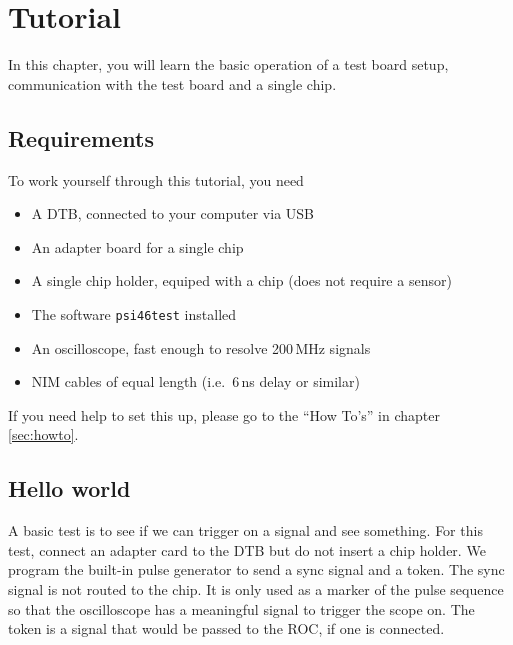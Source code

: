 \chapter{Tutorial}
In this chapter, you will learn the basic operation of a test board setup, communication with the test board and a single chip.

\section{Requirements}
To work yourself through this tutorial, you need
\begin{itemize}
    \item A DTB, connected to your computer via USB
    \item An adapter board for a single chip
    \item A single chip holder, equiped with a chip (does not require a sensor)
    \item The software \texttt{psi46test} installed
    \item An oscilloscope, fast enough to resolve 200\,MHz signals
    \item NIM cables of equal length (i.e.\, 6\,ns delay or similar)
\end{itemize}


If you need help to set this up, please go to the \enquote{How To's} in chapter \ref{sec:howto}.


\section{Hello world}



A basic test is to see if we can trigger on a signal and see something. For this test, connect an adapter card to the DTB but do not insert a chip holder. We program the built-in pulse generator to send a sync signal and a token. The sync signal is not routed to the chip. It is only used as a marker of the pulse sequence so that the oscilloscope has a meaningful signal to trigger the scope on. The token is a signal that would be passed to the ROC, if one is connected.


